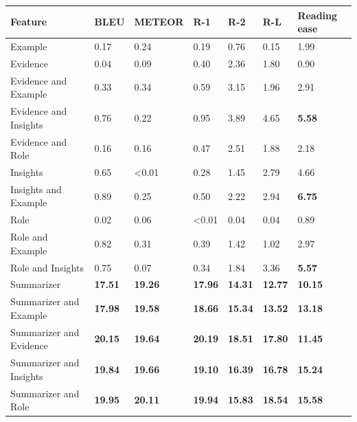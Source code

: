 \begin{tabular}{|l|l|l|l|l|l|l|}
\hline
\textbf{Feature} & BLEU & METEOR & R-1 & R-2 & R-L & Reading ease \\
 \hline
 Example & 0.17 & 0.24 & 0.19 & 0.76 & 0.15 & 1.99 \\
 \hline
 Evidence & 0.04 & 0.09 & 0.40 & 2.36 & 1.80 & 0.90 \\
 \hline
 Evidence and Example & 0.33 & 0.34 & 0.59 & 3.15 & 1.96 & 2.91 \\
 \hline
 Evidence and Insights & 0.76 & 0.22 & 0.95 & 3.89 & 4.65 & \textbf{5.58} \\
 \hline
 Evidence and Role & 0.16 & 0.16 & 0.47 & 2.51 & 1.88 & 2.18 \\
 \hline
 Insights & 0.65 & \textless{}0.01 & 0.28 & 1.45 & 2.79 & 4.66 \\
 \hline
 Insights and Example & 0.89 & 0.25 & 0.50 & 2.22 & 2.94 & \textbf{6.75} \\
 \hline
 Role & 0.02 & 0.06 & \textless{}0.01 & 0.04 & 0.04 & 0.89 \\
 \hline
 Role and Example & 0.82 & 0.31 & 0.39 & 1.42 & 1.02 & 2.97 \\
 \hline
 Role and Insights & 0.75 & 0.07 & 0.34 & 1.84 & 3.36 & \textbf{5.57} \\
 \hline
 Summarizer & \textbf{17.51} & \textbf{19.26} & \textbf{17.96} & \textbf{14.31} & \textbf{12.77} & \textbf{10.15} \\
 \hline
 Summarizer and Example & \textbf{17.98} & \textbf{19.58} & \textbf{18.66} & \textbf{15.34} & \textbf{13.52} & \textbf{13.18} \\
 \hline
 Summarizer and Evidence & \textbf{20.15} & \textbf{19.64} & \textbf{20.19} & \textbf{18.51} & \textbf{17.80} & \textbf{11.45} \\
 \hline
 Summarizer and Insights & \textbf{19.84} & \textbf{19.66} & \textbf{19.10} & \textbf{16.39} & \textbf{16.78} & \textbf{15.24} \\
 \hline
 Summarizer and Role & \textbf{19.95} & \textbf{20.11} & \textbf{19.94} & \textbf{15.83} & \textbf{18.54} & \textbf{15.58} \\
\hline
\end{tabular}
